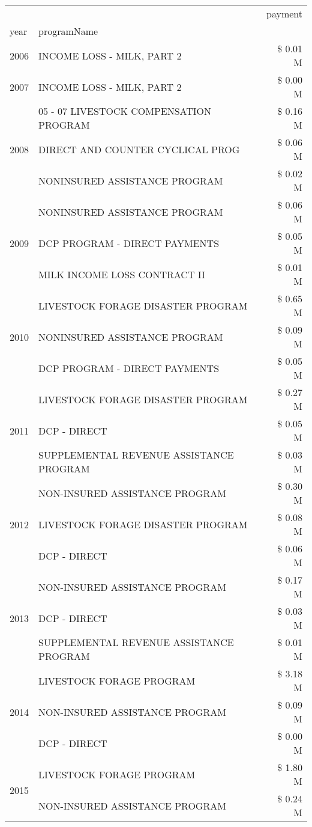 \begin{tabular}{llr}
\toprule
 &  & payment \\
year & programName &  \\
\midrule
2006 & INCOME LOSS - MILK, PART 2 & \$ 0.01 M \\
\cline{1-3}
2007 & INCOME LOSS - MILK, PART 2 & \$ 0.00 M \\
\cline{1-3}
\multirow[t]{3}{*}{2008} & 05 - 07 LIVESTOCK COMPENSATION PROGRAM & \$ 0.16 M \\
 & DIRECT AND COUNTER CYCLICAL PROG & \$ 0.06 M \\
 & NONINSURED ASSISTANCE PROGRAM & \$ 0.02 M \\
\cline{1-3}
\multirow[t]{3}{*}{2009} & NONINSURED ASSISTANCE PROGRAM & \$ 0.06 M \\
 & DCP PROGRAM - DIRECT PAYMENTS & \$ 0.05 M \\
 & MILK INCOME LOSS CONTRACT II & \$ 0.01 M \\
\cline{1-3}
\multirow[t]{3}{*}{2010} & LIVESTOCK FORAGE DISASTER  PROGRAM & \$ 0.65 M \\
 & NONINSURED ASSISTANCE PROGRAM & \$ 0.09 M \\
 & DCP PROGRAM - DIRECT PAYMENTS & \$ 0.05 M \\
\cline{1-3}
\multirow[t]{3}{*}{2011} & LIVESTOCK FORAGE DISASTER PROGRAM & \$ 0.27 M \\
 & DCP - DIRECT & \$ 0.05 M \\
 & SUPPLEMENTAL REVENUE ASSISTANCE PROGRAM & \$ 0.03 M \\
\cline{1-3}
\multirow[t]{3}{*}{2012} & NON-INSURED ASSISTANCE PROGRAM & \$ 0.30 M \\
 & LIVESTOCK FORAGE DISASTER PROGRAM & \$ 0.08 M \\
 & DCP - DIRECT & \$ 0.06 M \\
\cline{1-3}
\multirow[t]{3}{*}{2013} & NON-INSURED ASSISTANCE PROGRAM & \$ 0.17 M \\
 & DCP - DIRECT & \$ 0.03 M \\
 & SUPPLEMENTAL REVENUE ASSISTANCE PROGRAM & \$ 0.01 M \\
\cline{1-3}
\multirow[t]{3}{*}{2014} & LIVESTOCK FORAGE PROGRAM & \$ 3.18 M \\
 & NON-INSURED ASSISTANCE PROGRAM & \$ 0.09 M \\
 & DCP - DIRECT & \$ 0.00 M \\
\cline{1-3}
\multirow[t]{3}{*}{2015} & LIVESTOCK FORAGE PROGRAM & \$ 1.80 M \\
 & NON-INSURED ASSISTANCE PROGRAM & \$ 0.24 M \\

\end{tabular}
